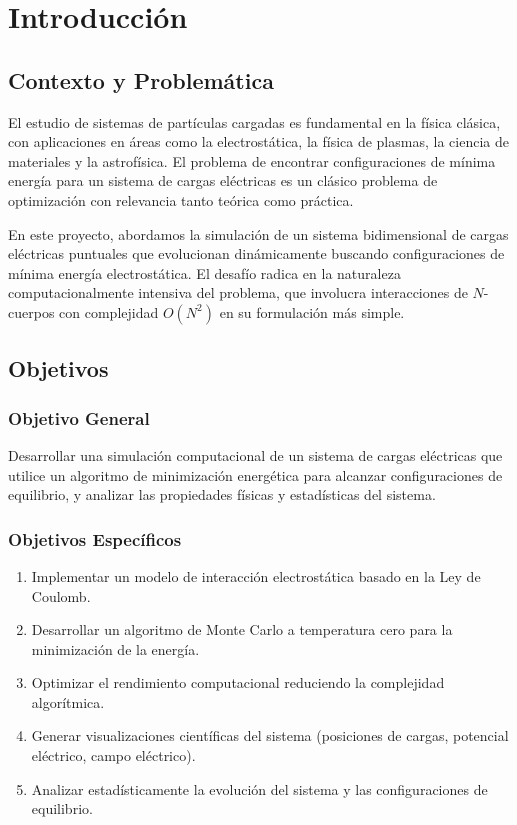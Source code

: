 
\chapter{Introducción}

\section{Contexto y Problemática}
El estudio de sistemas de partículas cargadas es fundamental en la física clásica, con aplicaciones en áreas como la electrostática, la física de plasmas, la ciencia de materiales y la astrofísica. El problema de encontrar configuraciones de mínima energía para un sistema de cargas eléctricas es un clásico problema de optimización con relevancia tanto teórica como práctica.

En este proyecto, abordamos la simulación de un sistema bidimensional de cargas eléctricas puntuales que evolucionan dinámicamente buscando configuraciones de mínima energía electrostática. El desafío radica en la naturaleza computacionalmente intensiva del problema, que involucra interacciones de \(N\)-cuerpos con complejidad \(O(N^2)\) en su formulación más simple.

\section{Objetivos}

\subsection{Objetivo General}
Desarrollar una simulación computacional de un sistema de cargas eléctricas que utilice un algoritmo de minimización energética para alcanzar configuraciones de equilibrio, y analizar las propiedades físicas y estadísticas del sistema.

\subsection{Objetivos Específicos}
\begin{enumerate}[label=\alph*)]
    \item Implementar un modelo de interacción electrostática basado en la Ley de Coulomb.
    \item Desarrollar un algoritmo de Monte Carlo a temperatura cero para la minimización de la energía.
    \item Optimizar el rendimiento computacional reduciendo la complejidad algorítmica.
    \item Generar visualizaciones científicas del sistema (posiciones de cargas, potencial eléctrico, campo eléctrico).
    \item Analizar estadísticamente la evolución del sistema y las configuraciones de equilibrio.
\end{enumerate}

